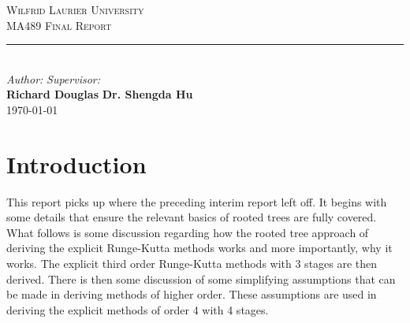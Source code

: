 \documentclass[12pt]{amsart}
\newcommand{\HRule}{\rule{\linewidth}{0.5mm}}
\theoremstyle{definition}
\begin{document}
\begin{titlepage}
%  
%  

  \vfill
  \textsc{\large Wilfrid Laurier University}
  \\[0.1cm]
  \textsc{\large MA489 Final Report}
  \HRule
  \\[0.5cm]
  
  \large \emph{Author:}
  \hfill
  \hfill
  \large \emph{Supervisor:}
  \\
  \large \textbf{Richard Douglas}
  \hfill
  \hfill
  \large \textbf{Dr. Shengda Hu}
  \\[2.0cm]
  \today{}
  \end{titlepage}
  
  \section{Introduction}
  This report picks up where the preceding interim report left off. It begins with some details that ensure the
  relevant basics of rooted trees are fully covered. What follows is some discussion regarding
  how the rooted tree approach of deriving the explicit Runge-Kutta methods works and more importantly, why it works. 
  The explicit third order Runge-Kutta methods with 3 stages are then derived. There is then some discussion
  of some simplifying assumptions that can be made in deriving methods of higher order. These assumptions are
  used in deriving the explicit methods of order 4 with 4 stages. 
  
\end{document}
